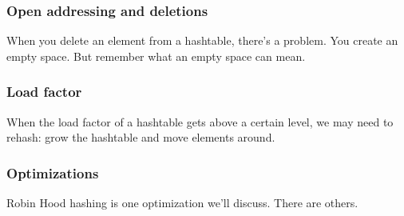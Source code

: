 \documentclass{beamer}
\begin{document}
\begin{frame}
    \frametitle{Open addressing and deletions}

    When you delete an element from a hashtable, there's a problem. You
    create an empty space. But remember what an empty space can mean.
\end{frame}

\begin{frame}
    \frametitle{Load factor}

    When the load factor of a hashtable gets above a certain level, we may
    need to rehash: grow the hashtable and move elements around.
\end{frame}

\begin{frame}
    \frametitle{Optimizations}

    Robin Hood hashing is one optimization we'll discuss. There are others.
\end{frame}
\end{document}

